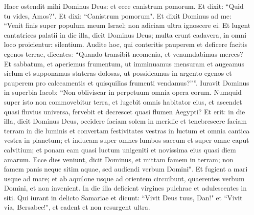 \begin{biblechapter}  
\verse Haec ostendit mihi Dominus Deus: et ecce canistrum pomorum. 
\verse Et dixit: “Quid tu vides, Amos?". Et dixi: “Canistrum pomorum". Et dixit Dominus ad me: “Venit finis super populum meum Israel; non adiciam ultra ignoscere ei. 
\verse Et lugent cantatrices palatii in die illa, dicit Dominus Deus; multa erunt cadavera, in omni loco proicientur: silentium. 
\verse Audite hoc, qui conteritis pauperem et deficere facitis egenos terrae, 
\verse dicentes: “Quando transibit neomenia, et venumdabimus merces? Et sabbatum, et aperiemus frumentum, ut imminuamus mensuram et augeamus siclum et supponamus stateras dolosas, 
\verse ut possideamus in argento egenos et pauperem pro calceamentis et quisquilias frumenti vendamus?””. 
\verse Iuravit Dominus in superbia Iacob: “Non obliviscar in perpetuum omnia opera eorum. 
\verse Numquid super isto non commovebitur terra, et lugebit omnis habitator eius, et ascendet quasi fluvius universa, fervebit et decrescet quasi flumen Aegypti? 
\verse Et erit: in die illa, dicit Dominus Deus, occidere faciam solem in meridie et tenebrescere faciam terram in die luminis 
\verse et convertam festivitates vestras in luctum et omnia cantica vestra in planctum; et inducam super omnes lumbos saccum et super omne caput calvitium; et ponam eam quasi luctum unigeniti et novissima eius quasi diem amarum. 
\verse Ecce dies veniunt, dicit Dominus, et mittam famem in terram; non famem panis neque sitim aquae, sed audiendi verbum Domini". 
\verse Et fugient a mari usque ad mare; et ab aquilone usque ad orientem circuibunt, quaerentes verbum Domini, et non invenient. 
\verse In die illa deficient virgines pulchrae et adulescentes in siti. 
\verse Qui iurant in delicto Samariae et dicunt: “Vivit Deus tuus, Dan!" et “Vivit via, Bersabee!", et cadent et non resurgent ultra. 
\end{biblechapter}

